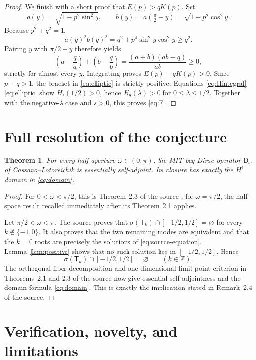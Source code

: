 \documentclass[11pt]{article}
\newtheorem{theorem}{Theorem}
\newcommand{\DD}{\mathsf D}
\newcommand{\TT}{\mathsf T}
\begin{document}
\begin{proof}
We finish with a short proof that $E(p)>qK(p)$.  Set
\[
 a(y)=\sqrt{1-p^2\sin^2y},\qquad
 b(y)=a(\tfrac\pi2-y)=\sqrt{1-p^2\cos^2y}.
\]
Because $p^2+q^2=1$,
\[
 a(y)^2b(y)^2=q^2+p^4\sin^2y\cos^2y\ge q^2.
\]
Pairing $y$ with $\pi/2-y$ therefore yields
\begin{equation}\label{eq:paired}
 \left(a-\frac q a\right)+\left(b-\frac q b\right)
 =\frac{(a+b)(ab-q)}{ab}\ge0,
\end{equation}
strictly for almost every $y$.  Integrating proves $E(p)-qK(p)>0$.
Since $p+q>1$, the bracket in \eqref{eq:elliptic} is strictly positive.
Equations \eqref{eq:Hintegral}--\eqref{eq:elliptic} show
$H_\theta(1/2)>0$, hence $H_\theta(\lambda)>0$ for
$0\le\lambda\le1/2$.  Together with the negative-$\lambda$ case and
$s>0$, this proves \eqref{eq:F}.
\end{proof}

\section{Full resolution of the conjecture}

\begin{theorem}\label{thm:main}
For every half-aperture $\omega\in(0,\pi)$, the MIT bag Dirac operator
$\DD_\omega$ of Cassano--Lotoreichik is essentially self-adjoint.  Its closure
has exactly the $H^1$ domain in \eqref{eq:domain}.
\end{theorem}

\begin{proof}
For $0<\omega<\pi/2$, this is Theorem~2.3 of the source
\cite{CassanoLotoreichik}; for $\omega=\pi/2$, the half-space result recalled
immediately after its Theorem~2.1 applies.

Let $\pi/2<\omega<\pi$.  The source proves that
$\sigma(\TT_k)\cap[-1/2,1/2]=\varnothing$ for every
$k\notin\{-1,0\}$.  It also proves that the two remaining modes are equivalent
and that the $k=0$ roots are precisely the solutions of
\eqref{eq:source-equation}.  Lemma~\ref{lem:positive} shows that no such
solution lies in $[-1/2,1/2]$.  Hence
\[
 \sigma(\TT_k)\cap[-1/2,1/2]=\varnothing
 \qquad(k\in\mathbb Z).
\]
The orthogonal fiber decomposition and one-dimensional limit-point criterion
in Theorems~2.1 and 2.3 of the source now give essential self-adjointness and
the domain formula \eqref{eq:domain}.  This is exactly the implication stated
in Remark~2.4 of the source.
\end{proof}

\section{Verification, novelty, and limitations}
\end{document}
